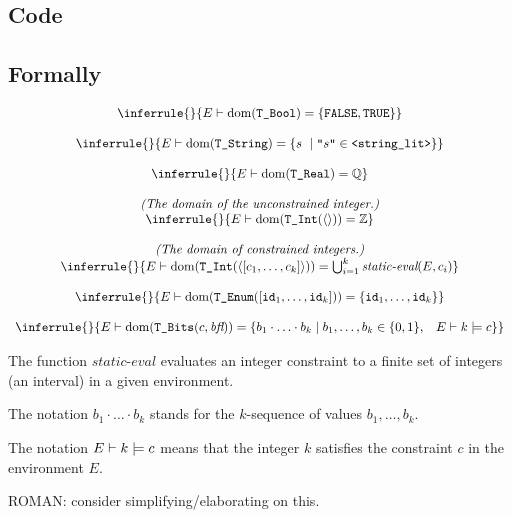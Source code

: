 \documentclass{book}
\newcommand\RuleComment[1]{\textit{(#1)}}
\newcommand\unconstrainedinteger[0]{\TInt(\langle\rangle)}
\newcommand\staticeval[0]{\textit{static-eval}}
\begin{document}
  \subsection{Code}

\begin{emptyformal}
      \subsection{Formally}
      
\[
\begin{array}{c}
\inferrule{}{ E \entails \dom(\TBool) = \{\texttt{FALSE}, \texttt{TRUE}\} }\\
\\
\inferrule{}{ E \entails \dom(\TString) = \{ s\ \;|\; \texttt{"}s\texttt{"} \in \texttt{<string\_lit>} \} }\\
\\
\inferrule{}{ E \entails \dom(\TReal) = \Q }\\
\\
\RuleComment{The domain of the unconstrained integer.}\\
\inferrule{}{ E \entails \dom(\unconstrainedinteger) = \Z }\\
\\
\RuleComment{The domain of constrained integers.}\\
\inferrule{}{ E \entails \dom(\TInt(\langle [c_1,\ldots,c_k] \rangle)) = \bigcup_{i=1}^k \staticeval(E, c_i)}\\
\\
\inferrule{}{ E \entails \dom(\TEnum([\id_1,\ldots,\id_k])) = \{\id_1,\ldots,\id_k\}}\\
\\
\inferrule{}{ E \entails \dom(\TBits(c, \textit{bfl})) = \{ b_1\cdot\ldots\cdot b_k \;|\; b_1,\ldots,b_k \in \{0,1\}, \;\;\; E \entails k \models c   \} }\\
\end{array}
\]

The function $\staticeval$ evaluates an integer constraint to a finite set of integers (an interval) in a given environment.

The notation $b_1\cdot\ldots\cdot b_k$ stands for the $k$-sequence of values $b_1,\ldots,b_k$.

The notation $E \vdash k \models c$ means that the integer $k$ satisfies the constraint $c$ in the environment $E$. 

\begin{emptytodo}
ROMAN: consider simplifying/elaborating on this.
\end{emptytodo}
\end{emptyformal}
\end{document}
